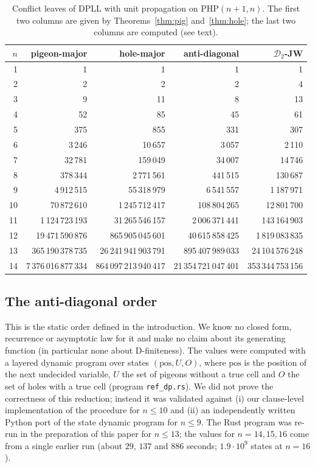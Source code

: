 \documentclass[11pt]{article}
\theoremstyle{definition}
\theoremstyle{remark}
\newcommand{\PHP}{\mathrm{PHP}}
\begin{document}
\begin{table}[ht]
\centering
\scriptsize
\begin{tabular}{r r r r r}
$n$ & pigeon-major & hole-major & anti-diagonal & $\mathcal D_2$-JW \\ \hline
1 & 1 & 1 & 1 & 1 \\
2 & 2 & 2 & 2 & 4 \\
3 & 9 & 11 & 8 & 13 \\
4 & 52 & 85 & 45 & 61 \\
5 & 375 & 855 & 331 & 307 \\
6 & 3\,246 & 10\,657 & 3\,057 & 2\,110 \\
7 & 32\,781 & 159\,049 & 34\,007 & 14\,746 \\
8 & 378\,344 & 2\,771\,561 & 441\,515 & 130\,687 \\
9 & 4\,912\,515 & 55\,318\,979 & 6\,541\,557 & 1\,187\,971 \\
10 & 70\,872\,610 & 1\,245\,712\,417 & 108\,804\,265 & 12\,801\,700 \\
11 & 1\,124\,723\,193 & 31\,265\,546\,157 & 2\,006\,371\,441 & 143\,164\,903 \\
12 & 19\,471\,590\,876 & 865\,905\,045\,601 & 40\,615\,858\,425 & 1\,819\,083\,835 \\
13 & 365\,190\,378\,735 & 26\,241\,941\,903\,791 & 895\,407\,989\,033 & 24\,104\,576\,248 \\
14 & 7\,376\,016\,877\,334 & 864\,097\,213\,940\,417 & 21\,354\,721\,047\,401 & 353\,344\,753\,156 \\
\end{tabular}
\caption{Conflict leaves of DPLL with unit propagation on $\PHP(n{+}1,n)$. The first two columns are given by
Theorems~\ref{thm:pig} and~\ref{thm:hole}; the last two columns are computed (see text).}
\label{tab:vals}
\end{table}

\subsection{The anti-diagonal order}
This is the static order defined in the introduction. We know no closed form, recurrence or asymptotic law for it
and make no claim about its generating function (in particular none about D-finiteness).
The values were computed with a layered dynamic program over states $(\mathrm{pos},U,O)$, where $\mathrm{pos}$ is the
position of the next undecided variable, $U$ the set of pigeons without a true cell and $O$ the set of holes with a
true cell (program \texttt{ref\_dp.rs}). We did not prove the correctness of this reduction; instead it
was validated against (i) our clause-level implementation of the procedure for $n\le10$ and (ii) an independently
written Python port of the state dynamic program for $n\le9$. The Rust program was re-run in the preparation of this
paper for $n\le13$; the values for $n=14,15,16$ come from a single earlier run (about $29$, $137$ and $886$ seconds; $1.9\cdot10^{9}$
states at $n=16$).
\end{document}
